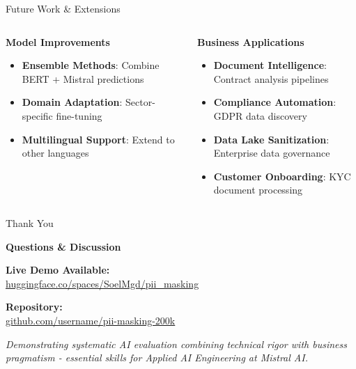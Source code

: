 \documentclass[aspectratio=169]{beamer}
\begin{document}
\begin{frame}{Future Work \& Extensions}
\begin{columns}
\begin{column}{0.5\textwidth}
\textbf{Model Improvements}
\begin{itemize}
\item \textbf{Ensemble Methods}: Combine BERT + Mistral predictions
\item \textbf{Domain Adaptation}: Sector-specific fine-tuning
\item \textbf{Multilingual Support}: Extend to other languages
\end{itemize}
\end{column}
\begin{column}{0.5\textwidth}
\textbf{Business Applications}
\begin{itemize}
\item \textbf{Document Intelligence}: Contract analysis pipelines
\item \textbf{Compliance Automation}: GDPR data discovery
\item \textbf{Data Lake Sanitization}: Enterprise data governance
\item \textbf{Customer Onboarding}: KYC document processing
\end{itemize}

\end{column}
\end{columns}
\end{frame}

\begin{frame}{Thank You}
\begin{center}
{\Large \textbf{Questions \& Discussion}}

\vspace{1cm}

\textbf{Live Demo Available:}\\
\href{https://huggingface.co/spaces/SoelMgd/pii_masking}{huggingface.co/spaces/SoelMgd/pii\_masking}

\vspace{0.5cm}

\textbf{Repository:}\\
\href{https://github.com/username/pii-masking-200k}{github.com/username/pii-masking-200k}

\vspace{1cm}

\textit{Demonstrating systematic AI evaluation combining technical rigor with business pragmatism - essential skills for Applied AI Engineering at Mistral AI.}
\end{center}
\end{frame}
\end{document}
